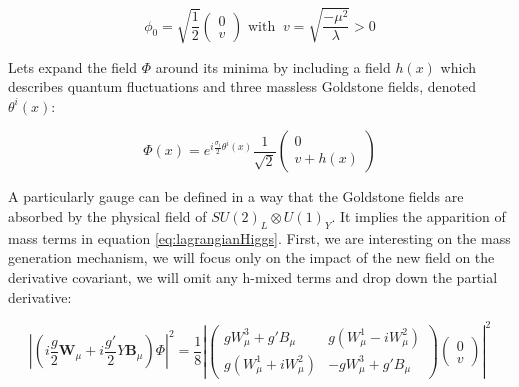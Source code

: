     \begin{equation}
      \phi_0 = \sqrt{\frac{1}{2}}
      \begin{pmatrix}
        0 \\
        v
      \end{pmatrix}
      \text{ with } \ v = \sqrt{\frac{- \mu^2}{\lambda}} > 0
      \label{eq:v}
    \end{equation}

    Lets expand the field $\Phi$ around its minima by including a field $h(x)$ which describes quantum fluctuations and three massless Goldstone fields, denoted $\theta^i(x)$:

    \begin{equation}
      \Phi(x) = e^{i\frac{\sigma_i}{2}\theta^i(x)} \frac{1}{\sqrt{2}}
                \begin{pmatrix}
                   0 \\
                   v + h(x)
                 \end{pmatrix}
      \label{eq:fieldHiggs}
    \end{equation}

     

%
    
    A particularly gauge can be defined in a way that the Goldstone fields are absorbed by the physical field of $SU(2)_L \otimes U(1)_Y$.
    It implies the apparition of mass terms in equation \ref{eq:lagrangianHiggs}.
    First, we are interesting on the mass generation mechanism, we will focus only on the impact of the new field on the derivative covariant, we will omit any h-mixed terms and drop down the partial derivative:

    \begin{equation}
      \left|\left(i\frac{g}{2}\textbf{W}_{\mu} +i\frac{g'}{2}Y\textbf{B}_{\mu}\right) \Phi \right|^2 = \frac{1}{8}\left|
              \begin{pmatrix}
                 gW^3_{\mu} +g'B_{\mu} & g(W^1_{\mu} - i W^2_{\mu}) \\
                 g(W^1_{\mu} + i W^2_{\mu}) & - g W^3_{\mu} + g'B_{\mu}
              \end{pmatrix}
              \begin{pmatrix}
                0 \\
                v
              \end{pmatrix}
         \right|^2
      \label{eq:derHiggs}
    \end{equation}

